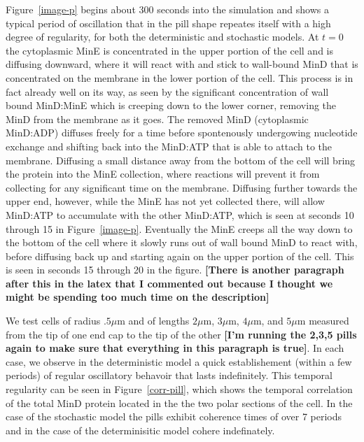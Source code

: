 \documentclass[letterpaper,twocolumn,amsmath,amssymb,pre]{revtex4-1}
\newcommand{\red}[1]{{\bf \color{red} #1}}
\newcommand{\fixme}[1]{\red{[#1]}}
\newcommand\micron{\ensuremath{\mu\text{m}}}
\begin{document}
Figure~\ref{image-p} begins about 300 seconds into the simulation and
shows a typical period of oscillation that in the pill shape repeates
itself with a high degree of regularity, for both the deterministic
and stochastic models.  At $t=0$ the cytoplasmic MinE is
concentrated in the upper portion of the cell and is diffusing
downward, where it will react with and stick to wall-bound MinD that
is concentrated on the membrane in the lower portion of the cell.
This process is in fact already well on its way, as seen by the
significant concentration of wall bound MinD:MinE which is creeping
down to the lower corner, removing the MinD from the membrane as it
goes.  The removed MinD (cytoplasmic MinD:ADP) diffuses freely for a
time before spontenously undergowing nucleotide exchange and shifting
back into the MinD:ATP that is able to attach to the membrane.
Diffusing a small distance away from the bottom of the cell will bring
the protein into the MinE collection, where reactions will prevent it
from collecting for any significant time on the membrane.  Diffusing
further towards the upper end, however, while the MinE has not yet
collected there, will allow MinD:ATP to accumulate with the other
MinD:ATP, which is seen at seconds 10 through 15 in
Figure~\ref{image-p}.  Eventually the MinE creeps all the way down to
the bottom of the cell where it slowly runs out of wall bound MinD to
react with, before diffusing back up and starting again on the upper
portion of the cell. This is seen in seconds 15 through 20 in the
figure.  \fixme{There is another paragraph after this in the latex
  that I commented out because I thought we might be spending too much
  time on the description}


We test cells of radius $.5\micron$ and of lengths $2\micron$,
$3\micron$, $4\micron$, and $5\micron$ measured from the tip of one
end cap to the tip of the other \fixme{I'm running the 2,3,5 pills
  again to make sure that everything in this paragraph is true}. In
each case, we observe in the deterministic model a quick
establishement (within a few periods) of regular oscillatory behavoir
that lasts indefinitely.  This temporal regularity can be seen in
Figure~\ref{corr-pill}, which shows the temporal correlation of the
total MinD protein located in the the two polar sections of the cell.
In the case of the stochastic model the pills exhibit coherence times
of over 7 periods and in the case of the determinisitic model cohere
indefinately.
\end{document}

